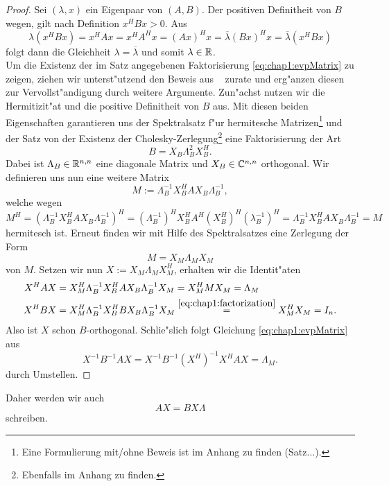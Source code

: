 \begin{proof}
Sei $(\lambda,x)$ ein Eigenpaar von $(A,B)$. Der positiven Definitheit von $B$ wegen, gilt nach Definition $x^H B x > 0$. Aus
\[
\lambda (x^H B x) = x^H Ax = x^H A^H x = (Ax)^H x
= \overline{\lambda} (Bx)^H x = \overline{\lambda} (x^H B x)
\]
folgt dann die Gleichheit $\lambda = \overline{\lambda}$ und somit $\lambda\in\mathbb{R}$.\\

 Um die Existenz der im Satz angegebenen Faktorisierung \eqref{eq:chap1:evpMatrix}
zu zeigen, ziehen wir unterst"utzend den Beweis aus ~\cite[Theorem 15.3.2, 344 f.]{parlett} zurate und erg"anzen diesen zur Vervollst"andigung durch weitere Argumente.
Zun"achst nutzen wir die Hermitizit"at und die positive Definitheit von $B$ aus. Mit diesen beiden Eigenschaften garantieren uns der Spektralsatz f"ur hermitesche Matrizen\footnote{Eine Formulierung mit/ohne Beweis ist im Anhang zu finden (Satz...).}
und der Satz von der Existenz der Cholesky-Zerlegung\footnote{Ebenfalls im Anhang zu finden.} eine Faktorisierung der Art
\begin{equation}\label{eq:chap1:factorization}
B = X_B \Lambda_B^2 X_B^H.
\end{equation}
Dabei ist $\Lambda_B\in\mathbb{R}^{n,n}$ eine diagonale Matrix und $X_B \in \mathbb{C}^{n,n}$ orthogonal.
Wir definieren uns nun eine weitere Matrix
\[
M:= \Lambda_B^{-1} X_B^H A X_B \Lambda_B^{-1},
\]
welche wegen
\[
M^H = \left(\Lambda_B^{-1} X_B^H A X_B \Lambda_B^{-1}\right)^H
= (\Lambda_B^{-1})^{H} X_B^H A^H (X_B^H)^H (\lambda_B^{-1})^H
= \Lambda_B^{-1} X_B^H A X_B \Lambda_B^{-1}
= M
\]
hermitesch ist. Erneut finden wir mit Hilfe des Spektralsatzes eine Zerlegung der Form
\[
M = X_M \Lambda_M X_M
\]
von $M$. Setzen wir nun $X:=X_M \Lambda_M X_M^H$, erhalten wir die Identit"aten
\begin{align*}
X^H A X &= X_M^H \Lambda_B^{-1} X_B^H A X_B \Lambda_B^{-1} X_M = X_M^H M X_M = \Lambda_M\\
X^H B X &= X_M^H \Lambda_B^{-1} X_B^H B X_B \Lambda_B^{-1} X_M \overset{\eqref{eq:chap1:factorization}}{=} X_M^H X_M = I_n.
\end{align*}
Also ist $X$ schon $B$-orthogonal. Schlie"slich folgt Gleichung \eqref{eq:chap1:evpMatrix} aus
\[
X^{-1}B^{-1}AX = X^{-1}B^{-1} (X^H)^{-1} X^H AX = \Lambda_M.
\]
durch Umstellen.
\end{proof}

Daher werden wir auch
\[
AX = B X \Lambda
\]
schreiben.






